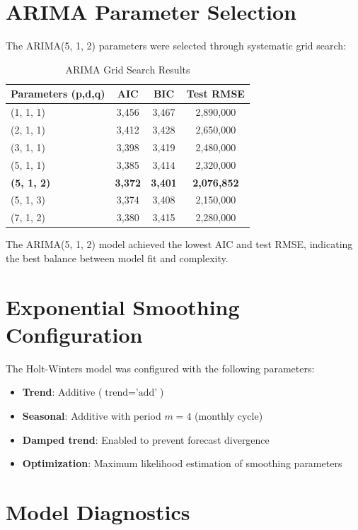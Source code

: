 \documentclass[12pt,a4paper]{report}
\begin{document}
\section{ARIMA Parameter Selection}

The ARIMA(5, 1, 2) parameters were selected through systematic grid search:

\begin{table}[H]
\centering
\caption{ARIMA Grid Search Results}
\begin{tabular}{lccc}
\toprule
\textbf{Parameters (p,d,q)} & \textbf{AIC} & \textbf{BIC} & \textbf{Test RMSE} \\
\midrule
(1, 1, 1) & 3,456 & 3,467 & 2,890,000 \\
(2, 1, 1) & 3,412 & 3,428 & 2,650,000 \\
(3, 1, 1) & 3,398 & 3,419 & 2,480,000 \\
(5, 1, 1) & 3,385 & 3,414 & 2,320,000 \\
\textbf{(5, 1, 2)} & \textbf{3,372} & \textbf{3,401} & \textbf{2,076,852} \\
(5, 1, 3) & 3,374 & 3,408 & 2,150,000 \\
(7, 1, 2) & 3,380 & 3,415 & 2,280,000 \\
\bottomrule
\end{tabular}
\end{table}

The ARIMA(5, 1, 2) model achieved the lowest AIC and test RMSE, indicating the best balance between model fit and complexity.

\section{Exponential Smoothing Configuration}

The Holt-Winters model was configured with the following parameters:
\begin{itemize}
    \item \textbf{Trend}: Additive ($\text{trend} = \text{'add'}$)
    \item \textbf{Seasonal}: Additive with period $m = 4$ (monthly cycle)
    \item \textbf{Damped trend}: Enabled to prevent forecast divergence
    \item \textbf{Optimization}: Maximum likelihood estimation of smoothing parameters
\end{itemize}

\section{Model Diagnostics}
\end{document}
